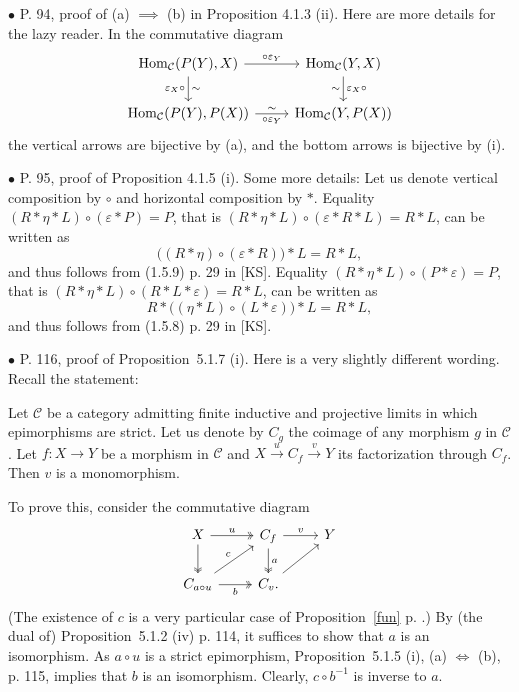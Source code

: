 \documentclass[12pt]{article}
\theoremstyle{remark}
\newcommand{\bu}{\bullet}
\newcommand{\n}{\noindent}
\newcommand{\C}{\mathcal C}
\newcommand{\e}{\varepsilon}
\newcommand{\xr}{\xrightarrow}
\newcommand{\cd}{commutative diagram}
\newcommand{\pr}{Proposition}
\DeclareMathOperator{\h}{Hom}
\begin{document}

\n$\bu$ P. 94, proof of (a) $\implies$ (b) in Proposition 4.1.3 (ii). Here are more details for the lazy reader. In the commutative diagram 
$$
\begin{tikzcd}
\h_\C(P(Y),X)\ar{d}{\sim}[swap]{\e_X\circ}\ar{r}{\circ\e_Y}&\h_\C(Y,X)\ar{d}{\e_X\circ}[swap]{\sim}\\ 
\h_\C(P(Y),P(X))\ar{r}[swap]{\circ\e_Y}{\sim}&\h_\C(Y,P(X))
\end{tikzcd}
$$ 
the vertical arrows are bijective by (a), and the bottom arrows is bijective by (i). 


\n$\bu$ P. 95, proof of Proposition 4.1.5 (i). Some more details: Let us denote vertical composition by $\circ$ and horizontal composition by $*$. Equality $(R*\eta*L)\circ(\e*P)=P$, that is $(R*\eta*L)\circ(\e*R*L)=R*L$, can be written as 
$$
\Big((R*\eta)\circ(\e*R)\Big)*L=R*L,
$$ 
and thus follows from (1.5.9) p. 29 in [KS]. Equality $(R*\eta*L)\circ(P*\e)=P$, that is $(R*\eta*L)\circ(R*L*\e)=R*L$, can be written as 
$$
R*\Big((\eta*L)\circ(L*\e)\Big)*L=R*L,
$$ 
and thus follows from (1.5.8) p. 29 in [KS]. 


\n$\bu$ P. 116, proof of \pr\ 5.1.7 (i). Here is a very slightly different wording. Recall the statement: 

Let $\C$ be a category admitting finite inductive and projective limits in which epimorphisms are strict. Let us denote by $C_g$ the coimage of any morphism $g$ in $\C$. Let $f:X\to Y$ be a morphism in $\C$ and $X\xr u C_f\xr v Y$ its factorization through $C_f$. Then $v$ is a monomorphism. 

To prove this, consider the \cd
$$
\begin{tikzcd}
X\ar[two heads]{d}\ar[two heads]{r}{u}&C_f\ar[two heads]{d}{a}\ar{r}{v}&Y\\
C_{a\circ u}\ar{ur}{c}\ar[two heads]{r}[swap]{b}&C_v.\ar{ru}
\end{tikzcd}
$$ 
(The existence of $c$ is a very particular case of \pr\ \ref{fun} p. \pageref{fun}.) By (the dual of) \pr\ 5.1.2 (iv) p. 114, it suffices to show that $a$ is an isomorphism. As $a\circ u$ is a strict epimorphism, \pr\ 5.1.5 (i), (a) $\iff$ (b), p. 115, implies that $b$ is an isomorphism. Clearly, $c\circ b^{-1}$ is inverse to $a$.  

\end{document}
